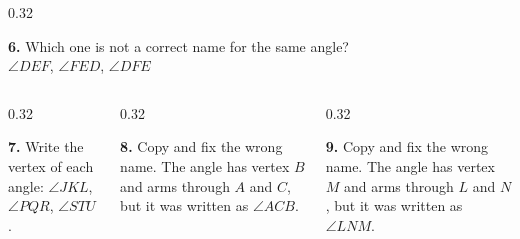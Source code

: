 \documentclass[aspectratio=169,12pt]{beamer}
\newcommand{\MMProblem}[2]{\begin{MMProblemCard}\raggedright\small\textbf{#1.} #2\par\end{MMProblemCard}}
\begin{document}
\begin{frame}[t]
\begin{columns}[T,onlytextwidth]
\begin{column}{0.32\textwidth}\MMProblem{6}{Which one is not a correct name for the same angle?\\[0.3em]\mbox{$\angle DEF$}, \mbox{$\angle FED$}, \mbox{$\angle DFE$}}\end{column}
\end{columns}
\vspace{0.45em}
\begin{columns}[T,onlytextwidth]
\begin{column}{0.32\textwidth}\MMProblem{7}{Write the vertex of each angle: \mbox{$\angle JKL$}, \mbox{$\angle PQR$}, \mbox{$\angle STU$}.}\end{column}
\begin{column}{0.32\textwidth}\MMProblem{8}{Copy and fix the wrong name. The angle has vertex \mbox{$B$} and arms through \mbox{$A$} and \mbox{$C$}, but it was written as \mbox{$\angle ACB$}.}\end{column}
\begin{column}{0.32\textwidth}\MMProblem{9}{Copy and fix the wrong name. The angle has vertex \mbox{$M$} and arms through \mbox{$L$} and \mbox{$N$}, but it was written as \mbox{$\angle LNM$}.}\end{column}
\end{columns}
\end{frame}
\end{document}
